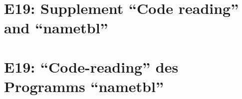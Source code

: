
\thispagestyle{empty}
\ifenglish
\section*{E19: Supplement ``Code reading'' and ``nametbl''}

\fi
\ifgerman
\section*{E19: "`Code-reading"' des Programms "`nametbl"'}

\fi


